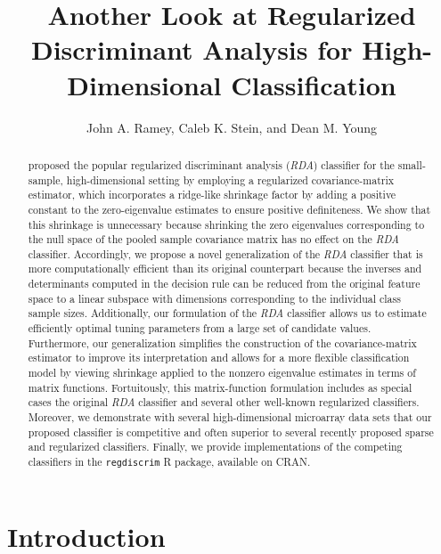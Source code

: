 \documentclass[11pt]{article}
\title{Another Look at Regularized Discriminant Analysis for High-Dimensional Classification}
\author{John A. Ramey, Caleb K. Stein, and Dean M. Young}
\begin{document}
\newtheorem{cor}{Corollary}
\newtheorem{lemma}{Lemma}
\newtheorem{proposition}{Proposition}
\newtheorem{thm}{Theorem}


\doublespacing

\maketitle

\begin{abstract}
\cite{Friedman:1989tm} proposed the popular regularized discriminant analysis (\emph{RDA}) classifier for the small-sample, high-dimensional setting by employing a regularized covariance-matrix estimator, which incorporates a ridge-like shrinkage factor by adding a positive constant to the zero-eigenvalue estimates to ensure positive definiteness. We show that this shrinkage is unnecessary because shrinking the zero eigenvalues corresponding to the null space of the pooled sample covariance matrix has no effect on the \emph{RDA} classifier. Accordingly, we propose a novel generalization of the \emph{RDA} classifier that is more computationally efficient than its original counterpart because the inverses and determinants computed in the decision rule can be reduced from the original feature space to a linear subspace with dimensions corresponding to the individual class sample sizes. Additionally, our formulation of the \emph{RDA} classifier allows us to estimate efficiently optimal tuning parameters from a large set of candidate values. Furthermore, our generalization simplifies the construction of the covariance-matrix estimator to improve its interpretation and allows for a more flexible classification model by viewing shrinkage applied to the nonzero eigenvalue estimates in terms of matrix functions. Fortuitously, this matrix-function formulation includes as special cases the original \emph{RDA} classifier and several other well-known regularized classifiers. Moreover, we demonstrate with several high-dimensional microarray data sets that our proposed classifier is competitive and often superior to several recently proposed sparse and regularized classifiers. Finally, we provide implementations of the competing classifiers in the {\tt regdiscrim} R package, available on CRAN.
\end{abstract}

\section{Introduction}
\end{document}
